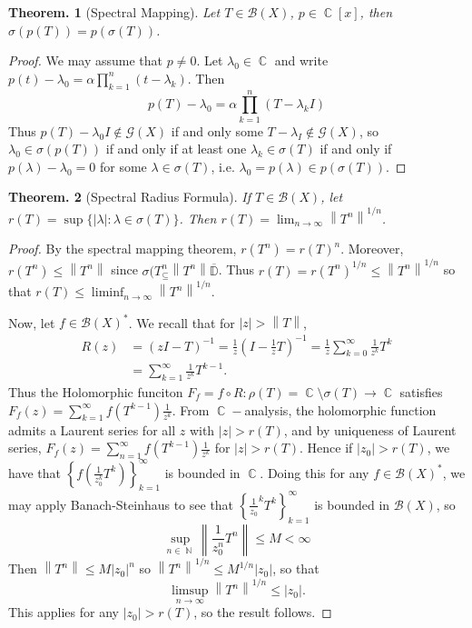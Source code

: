 \documentclass[11pt, a4paper]{memoir}
\DeclareMathOperator{\N}{{\mathbb{N}}}
\DeclareMathOperator{\C}{{\mathbb{C}}}
\newcommand{\norm}[1]{\ensuremath{\left\lVert#1\right\rVert}}
\theoremstyle{change}
\newtheorem{theorem}{Theorem.}[section]
\theoremstyle{plain}
\theoremstyle{nonumberplain}
\newtheorem{proof}{Proof}
\numberwithin{equation}{section}
\begin{document}
\begin{theorem}[Spectral Mapping]
    Let $T\in \mathcal{B}(X)$, $p\in\C[x]$, then $\sigma(p(T))=p(\sigma(T))$.
\end{theorem}
\begin{proof}
    We may assume that $p\neq 0$.
    Let $\lambda_0\in\C$ and write $p(t)-\lambda_0=\alpha\prod_{k=1}^n(t-\lambda_k)$.
    Then
    \begin{equation*}
        p(T)-\lambda_0 = \alpha\prod_{k=1}^n(T-\lambda_kI)
    \end{equation*}
    Thus $p(T)-\lambda_0I\notin\mathcal{G}(X)$ if and only some $T-\lambda_I\notin\mathcal{G}(X)$, so $\lambda_0\in\sigma(p(T))$ if and only if at least one $\lambda_k\in\sigma(T)$ if and only if $p(\lambda)-\lambda_0=0$ for some $\lambda\in\sigma(T)$, i.e. $\lambda_0=p(\lambda)\in p(\sigma(T))$.
\end{proof}
\begin{theorem}[Spectral Radius Formula]
    If $T\in\mathcal{B}(X)$, let $r(T)=\sup\{|\lambda|:\lambda\in\sigma(T)\}$.
    Then $r(T)=\lim_{n\to\infty}\norm{T^n}^{1/n}$.
\end{theorem}
\begin{proof}
    By the spectral mapping theorem, $r(T^n)=r(T)^n$.
    Moreover, $r(T^n)\leq\norm{T^n}$ since $\sigma(T^n_\subseteq\norm{T^n}\overline{\mathbb{D}}$.
    Thus $r(T)=r(T^n)^{1/n}\leq\norm{T^n}^{1/n}$ so that $r(T)\leq\liminf_{n\to\infty}\norm{T^n}^{1/n}$.

    Now, let $f\in\mathcal{B}(X)^*$.
    We recall that for $|z|>\norm{T}$,
    \begin{align*}
        R(z)&=(zI-T)^{-1}=\frac{1}{z}(I-\frac{1}{z}T)^{-1}=\frac{1}{z}\sum_{k=0}^\infty\frac{1}{z^k}T^k\\
            &= \sum_{k=1}^\infty\frac{1}{z^k}T^{k-1}.
    \end{align*}
    Thus the Holomorphic funciton $F_f=f\circ R:\rho(T)=\C\setminus\sigma(T)\to\C$ satisfies $F_f(z)=\sum_{k=1}^\infty f(T^{k-1})\frac{1}{z^k}$.
    From $\C-$analysis, the holomorphic function admits a Laurent series for all $z$ with $|z|>r(T)$, and by uniqueness of Laurent series, $F_f(z)=\sum_{n=1}^\infty f(T^{k-1})\frac{1}{z^k}$ for $|z|>r(T)$.
    Hence if $|z_0|>r(T)$, we have that $\left\{f\left(\frac{1}{z_0^k}T^k\right)\right\}_{k=1}^\infty$ is bounded in $\C$.
    Doing this for any $f\in\mathcal{B}(X)^*$, we may apply Banach-Steinhaus to see that $\left\{\frac{1}{z_0}^kT^k\right\}_{k=1}^\infty$ is bounded in $\mathcal{B}(X)$, so
    \begin{equation*}
        \sup_{n\in\N}\norm{\frac{1}{z_0^n}T^n}\leq M<\infty
    \end{equation*}
    Then $\norm{T^n}\leq M|z_0|^n$ so  $\norm{T^n}^{1/n}\leq M^{1/n}|z_0|$, so that
    \begin{equation*}
        \limsup_{n\to\infty}\norm{T^n}^{1/n}\leq|z_0|.
    \end{equation*}
    This applies for any $|z_0|>r(T)$, so the result follows.
\end{proof}
\end{document}
